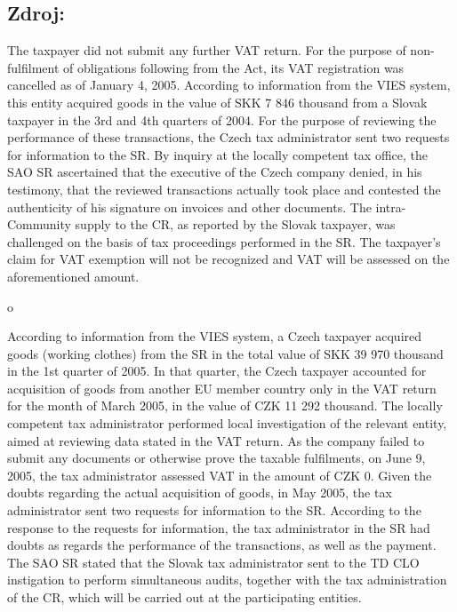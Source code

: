 \documentclass[10pt]{article}
\begin{document}
\subsection*{Zdroj:}

The taxpayer did not submit any further VAT return.
For the purpose of non-fulfilment of obligations following from the Act, its VAT registration was cancelled as of January 4, 2005.
According to information from the VIES system, this entity acquired goods in the value of SKK 7 846 thousand from a Slovak taxpayer in the 3rd and 4th quarters of 2004.
For the purpose of reviewing the performance of these transactions, the Czech tax administrator sent two requests for information to the SR.
By inquiry at the locally competent tax office, the SAO SR ascertained that the executive of the Czech company denied, in his testimony, that the reviewed transactions actually took place and contested the authenticity of his signature on invoices and other documents.
The intra-Community supply to the CR, as reported by the Slovak taxpayer, was challenged on the basis of tax proceedings performed in the SR.
The taxpayer’s claim for VAT exemption will not be recognized and VAT will be assessed on the aforementioned amount.


o

According to information from the VIES system, a Czech taxpayer acquired goods (working clothes) from the SR in the total value of SKK 39 970 thousand in the 1st quarter of 2005.
In that quarter, the Czech taxpayer accounted for acquisition of goods from another EU member country only in the VAT return for the month of March 2005, in the value of CZK 11 292 thousand.
The locally competent tax administrator performed local investigation of the relevant entity, aimed at reviewing data stated in the VAT return.
As the company failed to submit any documents or otherwise prove the taxable fulfilments, on June 9, 2005, the tax administrator assessed VAT in the amount of CZK 0.
Given the doubts regarding the actual acquisition of goods, in May 2005, the tax administrator sent two requests for information to the SR.
According to the response to the requests for information, the tax administrator in the SR had doubts as regards the performance of the transactions, as well as the payment.
The SAO SR stated that the Slovak tax administrator sent to the TD CLO instigation to perform simultaneous audits, together with the tax administration of the CR, which will be carried out at the participating entities.


\pagebreak
\end{document}

